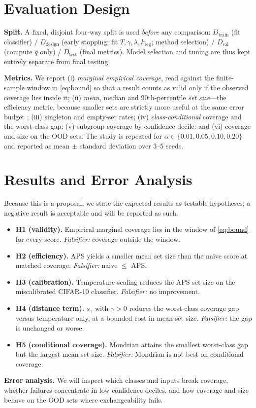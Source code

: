 \documentclass{article}
\begin{document}
\section{Evaluation Design}
\textbf{Split.} A fixed, disjoint four-way split is used \emph{before} any comparison:
$D_{\text{train}}$ (fit classifier) / $D_{\text{design}}$ (early stopping; fit
$T,\gamma,\lambda,k_{\text{reg}}$; method selection) / $D_{\text{cal}}$ (compute $\hat q$ only) /
$D_{\text{test}}$ (final metrics). Model selection and tuning are thus kept entirely separate from
final testing.

\textbf{Metrics.} We report (i) \emph{marginal empirical coverage}, read against the finite-sample
window in \eqref{eq:bound} so that a result counts as valid only if the observed coverage lies inside
it; (ii) \emph{mean}, median and 90th-percentile \emph{set size}---the efficiency metric, because
smaller sets are strictly more useful at the same error budget \citep{sadinle2019least}; (iii)
singleton and empty-set rates; (iv) \emph{class-conditional} coverage and the worst-class gap; (v)
subgroup coverage by confidence decile; and (vi) coverage and size on the OOD sets. The study is
repeated for $\alpha\in\{0.01,0.05,0.10,0.20\}$ and reported as mean $\pm$ standard deviation over
3--5 seeds.

\section{Results and Error Analysis}
Because this is a proposal, we state the expected results as testable hypotheses; a negative result
is acceptable and will be reported as such.
\begin{itemize}
  \item \textbf{H1 (validity).} Empirical marginal coverage lies in the window of \eqref{eq:bound}
        for every score. \emph{Falsifier:} coverage outside the window.
  \item \textbf{H2 (efficiency).} APS yields a smaller mean set size than the naive score at matched
        coverage. \emph{Falsifier:} naive $\le$ APS.
  \item \textbf{H3 (calibration).} Temperature scaling reduces the APS set size on the miscalibrated
        CIFAR-10 classifier. \emph{Falsifier:} no improvement.
  \item \textbf{H4 (distance term).} $s_\gamma$ with $\gamma>0$ reduces the worst-class coverage gap
        versus temperature-only, at a bounded cost in mean set size. \emph{Falsifier:} the gap is
        unchanged or worse.
  \item \textbf{H5 (conditional coverage).} Mondrian attains the smallest worst-class gap but the
        largest mean set size. \emph{Falsifier:} Mondrian is not best on conditional coverage.
\end{itemize}
\textbf{Error analysis.} We will inspect which classes and inputs break coverage, whether failures
concentrate in low-confidence deciles, and how coverage and size behave on the OOD sets where
exchangeability fails.
\end{document}
